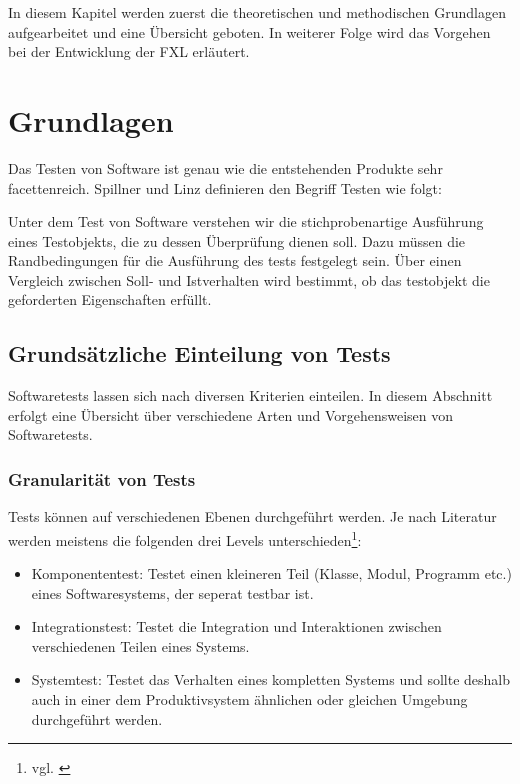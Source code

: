 In diesem Kapitel werden zuerst die theoretischen und methodischen Grundlagen aufgearbeitet und eine Übersicht geboten. In weiterer Folge wird das Vorgehen bei der Entwicklung der FXL erläutert.



\section{Grundlagen}

Das Testen von Software ist genau wie die entstehenden Produkte sehr facettenreich. Spillner und Linz definieren den Begriff Testen wie folgt:

\begin{myquote}
Unter dem Test von Software verstehen wir die stichprobenartige Ausführung eines Testobjekts, die zu dessen Überprüfung dienen soll. Dazu müssen die Randbedingungen für die Ausführung des tests festgelegt sein. Über einen Vergleich zwischen Soll- und Istverhalten wird bestimmt, ob das testobjekt die geforderten Eigenschaften erfüllt.\cite{SpLi10}
\end{myquote}

\subsection{Grundsätzliche Einteilung von Tests}

Softwaretests lassen sich nach diversen Kriterien einteilen. In diesem Abschnitt erfolgt eine Übersicht über verschiedene Arten und Vorgehensweisen von Softwaretests.

\subsubsection{Granularität von Tests}

Tests können auf verschiedenen Ebenen durchgeführt werden. Je nach Literatur werden meistens die folgenden drei Levels unterschieden\footnote{vgl. \cite{ISTQB1}}:

\begin{itemize}
  \item Komponententest: Testet einen kleineren Teil (Klasse, Modul, Programm etc.) eines Softwaresystems, der seperat testbar ist.
  \item Integrationstest: Testet die Integration und Interaktionen zwischen verschiedenen Teilen eines Systems.
  \item Systemtest: Testet das Verhalten eines kompletten Systems und sollte deshalb auch in einer dem Produktivsystem ähnlichen oder gleichen Umgebung durchgeführt werden.
\end{itemize}

